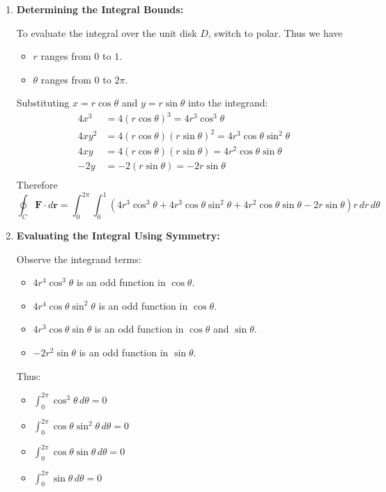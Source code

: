 \begin{example}
\begin{solution}
\begin{enumerate}
    \item \textbf{Determining the Integral Bounds:}
    
    To evaluate the integral over the unit disk $D$, switch to polar. Thus we have
    \begin{itemize}
        \item $r$ ranges from $0$ to $1$.
        \item $\theta$ ranges from $0$ to $2\pi$.
    \end{itemize}
    Substituting $x = r\cos\theta$ and $y = r\sin\theta$ into the integrand:
    \[
    \begin{aligned}
    4x^3 &= 4(r\cos\theta)^3 = 4r^3\cos^3\theta \\
    4xy^2 &= 4(r\cos\theta)(r\sin\theta)^2 = 4r^3\cos\theta\sin^2\theta \\
    4xy &= 4(r\cos\theta)(r\sin\theta) = 4r^2\cos\theta\sin\theta \\
    -2y &= -2(r\sin\theta) = -2r\sin\theta \\
    \end{aligned}
    \]
    Therefore
    \[
    \oint_C \mathbf{F} \cdot d\mathbf{r} = \int_{0}^{2\pi} \int_{0}^{1} \left(4r^3\cos^3\theta + 4r^3\cos\theta\sin^2\theta + 4r^2\cos\theta\sin\theta - 2r\sin\theta\right) r\,dr\,d\theta
    \]
    \item \textbf{Evaluating the Integral Using Symmetry:}
    
    Observe the integrand terms:
    \begin{itemize}
        \item $4r^4\cos^3\theta$ is an odd function in $\cos\theta$.
        \item $4r^4\cos\theta\sin^2\theta$ is an odd function in $\cos\theta$.
        \item $4r^3\cos\theta\sin\theta$ is an odd function in $\cos\theta$ and $\sin\theta$.
        \item $-2r^2\sin\theta$ is an odd function in $\sin\theta$.
    \end{itemize}
    Thus:
        \begin{itemize}
            \item $\int_{0}^{2\pi} \cos^3\theta\,d\theta = 0$
            \item $\int_{0}^{2\pi} \cos\theta\sin^2\theta\,d\theta = 0$
            \item $\int_{0}^{2\pi} \cos\theta\sin\theta\,d\theta = 0$
            \item $\int_{0}^{2\pi} \sin\theta\,d\theta = 0$
        \end{itemize}
    

\end{enumerate}
\end{solution}
\end{example}
